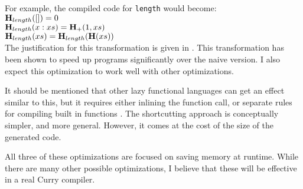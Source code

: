 For example, the compiled code for \texttt{length} would become:\\
$\mbox{\bf H$_{length}$}([]) = 0$\\
$\mbox{\bf H$_{length}$}(x:xs) = \mbox{\bf H$_{+}$}(1, xs)$\\
$\mbox{\bf H$_{length}$}(xs) = \mbox{\bf H}_{length}(\mbox{\bf H}(xs))$\\

The justification for this transformation is given in \cite{shortcutting}.
This transformation has been shown to speed up programs significantly over the naive version.
I also expect this optimization to work well with other optimizations.

It should be mentioned that other lazy functional languages can get an effect similar to this,
but it requires either inlining the function call,
or separate rules for compiling built in functions \cite{functional_PeytonJones}.
The shortcutting approach is conceptually simpler, and more general.
However, it comes at the cost of the size of the generated code.

All three of these optimizations are focused on saving memory at runtime.
While there are many other possible optimizations,
I believe that these will be effective in a real Curry compiler.

